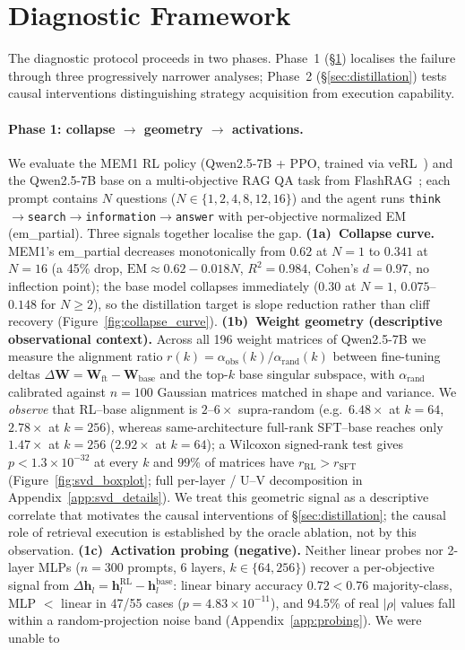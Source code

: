 \section{Diagnostic Framework}
\label{sec:framework}

The diagnostic protocol proceeds in two phases. Phase~1 (\S\ref{sec:framework}) localises the failure through three progressively narrower analyses; Phase~2 (\S\ref{sec:distillation}) tests causal interventions distinguishing strategy acquisition from execution capability.

\paragraph{Phase 1: collapse $\to$ geometry $\to$ activations.}
We evaluate the MEM1 RL policy (Qwen2.5-7B + PPO, trained via veRL~\cite{sheng2024verl}) and the Qwen2.5-7B base on a multi-objective RAG QA task from FlashRAG~\cite{jin2025flashrag}; each prompt contains $N$ questions ($N\in\{1,2,4,8,12,16\}$) and the agent runs \texttt{think}$\to$\texttt{search}$\to$\texttt{information}$\to$\texttt{answer} with per-objective normalized EM (em\_partial). Three signals together localise the gap. \textbf{(1a)~Collapse curve.} MEM1's em\_partial decreases monotonically from $0.62$ at $N\!=\!1$ to $0.341$ at $N\!=\!16$ (a 45\% drop, $\text{EM}\!\approx\!0.62-0.018N$, $R^2\!=\!0.984$, Cohen's $d\!=\!0.97$, no inflection point); the base model collapses immediately ($0.30$ at $N\!=\!1$, $0.075$--$0.148$ for $N\!\geq\!2$), so the distillation target is slope reduction rather than cliff recovery (Figure~\ref{fig:collapse_curve}). \textbf{(1b)~Weight geometry (descriptive observational context).} Across all 196 weight matrices of Qwen2.5-7B we measure the alignment ratio $r(k)\!=\!\alpha_\text{obs}(k)/\alpha_\text{rand}(k)$ between fine-tuning deltas $\Delta\mathbf{W}\!=\!\mathbf{W}_\text{ft}-\mathbf{W}_\text{base}$ and the top-$k$ base singular subspace, with $\alpha_\text{rand}$ calibrated against $n\!=\!100$ Gaussian matrices matched in shape and variance. We \emph{observe} that RL--base alignment is $2$--$6\!\times$ supra-random (e.g.\ $6.48\!\times$ at $k\!=\!64$, $2.78\!\times$ at $k\!=\!256$), whereas same-architecture full-rank SFT--base reaches only $1.47\!\times$ at $k\!=\!256$ ($2.92\!\times$ at $k\!=\!64$); a Wilcoxon signed-rank test gives $p\!<\!1.3\!\times\!10^{-32}$ at every $k$ and $99\%$ of matrices have $r_\text{RL}\!>\!r_\text{SFT}$ (Figure~\ref{fig:svd_boxplot}; full per-layer / U--V decomposition in Appendix~\ref{app:svd_details}). We treat this geometric signal as a descriptive correlate that motivates the causal interventions of \S\ref{sec:distillation}; the causal role of retrieval execution is established by the oracle ablation, not by this observation. \textbf{(1c)~Activation probing (negative).} Neither linear probes nor 2-layer MLPs ($n\!=\!300$ prompts, 6 layers, $k\!\in\!\{64,256\}$) recover a per-objective signal from $\Delta\mathbf{h}_l\!=\!\mathbf{h}_l^\text{RL}-\mathbf{h}_l^\text{base}$: linear binary accuracy $0.72\!<\!0.76$ majority-class, MLP $<$ linear in 47/55 cases ($p\!=\!4.83\!\times\!10^{-11}$), and 94.5\% of real $|\rho|$ values fall within a random-projection noise band (Appendix~\ref{app:probing}). We were unable to 